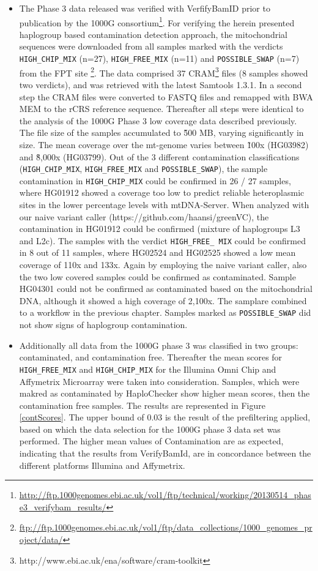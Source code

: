 \begin{itemize}
\item The Phase 3 data released was verified with VerfifyBamID prior to publication by the 1000G consortium\footnote{\url{http://ftp.1000genomes.ebi.ac.uk/vol1/ftp/technical/working/20130514_phase3_verifybam_results/}}. For verifying the herein presented haplogroup based contamination detection approach, the mitochondrial sequences were downloaded from all samples marked with the verdicts \verb|HIGH_CHIP_MIX| (n=27), \verb|HIGH_FREE_MIX| (n=11) and \verb|POSSIBLE_SWAP| (n=7) from the FPT site \footnote{\url{ftp://ftp.1000genomes.ebi.ac.uk/vol1/ftp/data_collections/1000_genomes_project/data/}}. The data comprised 37 CRAM\footnote{http://www.ebi.ac.uk/ena/software/cram-toolkit} files (8 samples showed two verdicts), and was retrieved with the latest Samtools 1.3.1. In a second step the CRAM files were converted to FASTQ files and remapped with BWA MEM to the rCRS reference sequence. Thereafter all steps were identical to the analysis of the 1000G Phase 3 low coverage data described previously.
The file size of the samples accumulated to \~ 500 MB, varying significantly in size. The mean coverage over the mt-genome varies between \~100x (HG03982) and \~8,000x (HG03799). Out of the 3 different contamination classifications (\verb|HIGH_CHIP_MIX|, \verb|HIGH_FREE_MIX| and \verb|POSSIBLE_SWAP|), the sample contamination in \verb|HIGH_CHIP_MIX| could be confirmed in 26 / 27 samples, where HG01912 showed a coverage too low to predict reliable heteroplasmic sites in the lower percentage levels with mtDNA-Server. When analyzed with our naive variant caller (https://github.com/haansi/greenVC), the contamination in HG01912 could be confirmed (mixture of haplogroups L3 and L2c). The samples with the verdict \verb|HIGH_FREE_ MIX| could be confirmed in 8  out of 11 samples, where HG02524 and HG02525 showed a low mean coverage of 110x and 133x. Again by employing the naive variant caller, also the two low covered samples could be confirmed as contaminated. Sample HG04301 could not be confirmed as contaminated based on the mitochondrial DNA, although it showed a high coverage of 2,100x. The samplare combined to a workflow in the previous chapter. Samples marked as \verb|POSSIBLE_SWAP| did not show signs of haplogroup contamination.
\item Additionally all data from the 1000G phase 3 was classified in two groups: contaminated, and contamination free. Thereafter the mean scores for  \verb|HIGH_FREE_MIX| and \verb|HIGH_CHIP_MIX| for the Illumina Omni Chip and Affymetrix Microarray were taken into consideration. Samples, which were makred as contaminated by HaploChecker show higher mean scores, then the contamination free samples. The results are represented in Figure \ref{contScores}. The upper bound of 0.03 is the result of the prefiltering applied, based on which the data selection for the 1000G phase 3 data set was performed. The higher mean values of Contamination are as expected, indicating that the results from VerifyBamId, are in concordance between the different platforms Illumina and Affymetrix.

\end{itemize}
